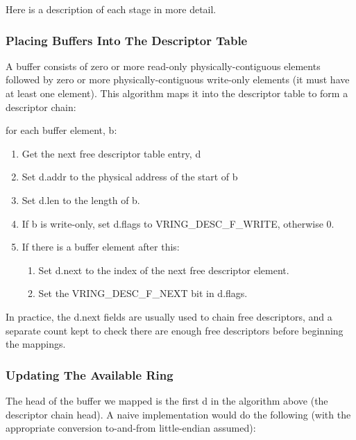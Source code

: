 Here is a description of each stage in more detail.

\subsubsection{Placing Buffers Into The Descriptor Table}\label{sec:General Initialization And Device Operation / Device Operation / Supplying Buffers to The Device / Placing Buffers Into The Descriptor Table}

A buffer consists of zero or more read-only physically-contiguous
elements followed by zero or more physically-contiguous
write-only elements (it must have at least one element). This
algorithm maps it into the descriptor table to form a descriptor
chain:

for each buffer element, b:

\begin{enumerate}
\item Get the next free descriptor table entry, d
\item Set d.addr to the physical address of the start of b
\item Set d.len to the length of b.
\item If b is write-only, set d.flags to VRING_DESC_F_WRITE,
    otherwise 0.
\item If there is a buffer element after this:
    \begin{enumerate}
    \item Set d.next to the index of the next free descriptor
      element.
    \item Set the VRING_DESC_F_NEXT bit in d.flags.
    \end{enumerate}
\end{enumerate}

In practice, the d.next fields are usually used to chain free
descriptors, and a separate count kept to check there are enough
free descriptors before beginning the mappings.

\subsubsection{Updating The Available Ring}\label{sec:General Initialization And Device Operation / Device Operation / Supplying Buffers to The Device / Updating The Available Ring}

The head of the buffer we mapped is the first d in the algorithm
above (the descriptor chain head).  A naive implementation would do the following (with the
appropriate conversion to-and-from little-endian assumed):


